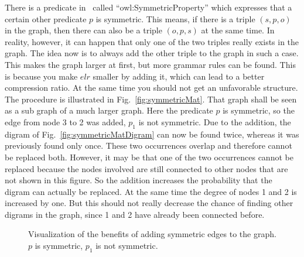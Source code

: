 There is a predicate in~\cite{owl} called \enquote{owl:SymmetricProperty} which expresses that a certain other predicate $p$ is symmetric. This means, if there is a triple $(s,p,o)$ in the graph, then there can also be a triple $(o,p,s)$ at the same time. In reality, however, it can happen that only one of the two triples really exists in the graph. The idea now is to always add the other triple to the graph in such a case. This makes the graph larger at first, but more grammar rules can be found. This is because you make $elr$ smaller by adding it, which can lead to a better compression ratio. At the same time you should not get an unfavorable structure. The procedure is illustrated in Fig.~\ref{fig:symmetricMat}. That graph shall be seen as a sub graph of a much larger graph. Here the predicate $p$ is symmetric, so the edge from node 3 to 2 was added, $p_1$ is not symmetric. Due to the addition, the digram of Fig.~\ref{fig:symmetricMatDigram} can now be found twice, whereas it was previously found only once. These two occurrences overlap and therefore cannot be replaced both. However, it may be that one of the two occurrences cannot be replaced because the nodes involved are still connected to other nodes that are not shown in this figure. So the addition increases the probability that the digram can actually be replaced. At the same time the degree of nodes 1 and 2 is increased by one. But this should not really decrease the chance of finding other digrams in the graph, since 1 and 2 have already been connected before.


\begin{figure}[h]
	\centering
	\hfill
	\caption{Visualization of the benefits of adding symmetric edges to the graph. $p$ is symmetric, $p_1$ is not symmetric.}
	\label{}
\end{figure}

